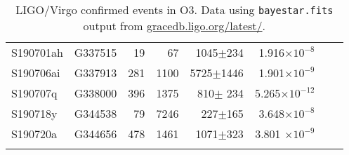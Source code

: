 \begin{table}
\begin{tabular}{  l c r r r r l r }
  S190701ah & G337515 & 19 & 67          & 1045$\pm$234      & 1.916$\times10^{-8}$\\
  S190706ai & G337913 & 281 & 1100     & 5725$\pm$1446    & 1.901$\times10^{-9}$\\
  S190707q & G338000 & 396 & 1375      & 810$\pm$ 234      & 5.265$\times10^{-12}$\\
  S190718y &	G344538 &   79  &	7246  & 227$\pm$165       & 3.648$\times10^{-8}$ \\ 
  S190720a &	G344656	&   478 & 1461  & 1071$\pm$323	  & 3.801 $\times10^{-9}$ \\ 
&&&&& \\
\hline
\hline
\end{tabular}
 \caption{LIGO/Virgo confirmed events in O3. Data using {\tt bayestar.fits} output from \href{https://gracedb.ligo.org/latest/}{gracedb.ligo.org/latest/}. }
\end{table}

